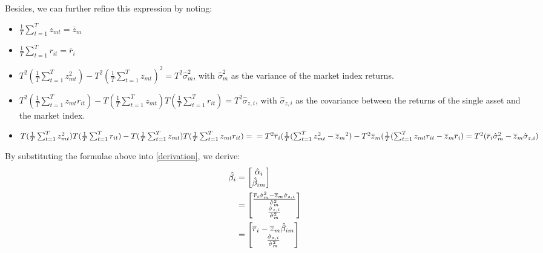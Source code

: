 \documentclass[12pt]{article}
\begin{document}
Besides, we can further refine this expression by noting:
\begin{itemize}
\item $\frac{1}{T}\sum_{t=1}^{T}z_{mt} =\overline{z}_m $
\item $\frac{1}{T}\sum_{t=1}^{T}r_{it} =\overline{r}_i $
\item $T^2(\frac{1}{T}\sum_{t=1}^{T}z_{mt}^2)-T^2(\frac{1}{T}\sum_{t=1}^{T}z_{mt})^2 = T^2\hat{\sigma}_{m}^2 $, with $\hat{\sigma}_{m}^2$ as the variance of the market index returns.
\item $T^2(\frac{1}{T}\sum_{t=1}^{T}z_{mt}r_{it}) - T(\frac{1}{T}\sum_{t=1}^{T}z_{mt}) T(\frac{1}{T}\sum_{t=1}^{T}r_{it}) = T^2\hat{\sigma}_{z,i}$, with $\hat{\sigma}_{z,i} $ as the covariance between the returns of the single asset and the market index.
\item $T(\frac{1}{T}\sum_{t=1}^{T}z_{mt}^2) T(\frac{1}{T}\sum_{t=1}^{T}r_{it}) - T(\frac{1}{T}\sum_{t=1}^{T}z_{mt})T(\frac{1}{T}\sum_{t=1}^{T}z_{mt}r_{it}) = \\ 
= T^2\overline{r}_i(\frac{1}{T}(\sum_{t=1}^{T}z_{mt}^2-\overline{z}_m{^2})- T^2\overline{z}_m(\frac{1}{T}(\sum_{t=1}^{T}z_{mt}r_{it}-\overline{z}_m\overline{r}_i) \\
= T^2(\overline{r}_i\hat{\sigma}_{m}^2 -\overline{z}_m\hat{\sigma}_{z,i})$
\end{itemize}
By substituting the formulae above into \ref{derivation}, we derive:
\begin{align}
			\hat{\beta_i} &= \begin{bmatrix} \hat{\alpha}_i \\ \hat{\beta}_{im} \end{bmatrix} \notag \\
 			&= \begin{bmatrix} \frac{\overline{r}_i\hat{\sigma}_{m}^2-\overline{z}_m\hat{\sigma}_{z,i}}{\hat{\sigma}_{m}^2} \\ \frac{\hat{\sigma}_{z,i}}{\hat{\sigma}_{m}^2} \end{bmatrix} \notag \\
 			&= \begin{bmatrix} \overline{r}_i - \overline{z}_m\hat{\beta}_{im} \\ \frac{\hat{\sigma}_{z,i}}{\hat{\sigma}_{m}^2} \end{bmatrix}
\end{align}
\end{document}
